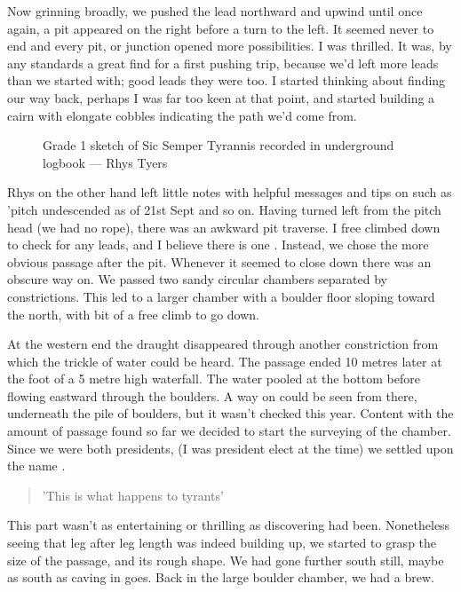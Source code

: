 Now grinning broadly, we pushed the lead northward and upwind until once again, a pit appeared on the right before a turn to the left. It seemed never to end and every pit, or junction opened more possibilities. I was thrilled. It was, by any standards a great find for a first pushing trip, because we'd left more leads than we started with; good leads they were too. I started thinking about finding our way back, perhaps I was far too keen at that point, and started building a cairn with elongate cobbles indicating the path we'd come from. 

\begin{figure}[t!]
\checkoddpage \ifoddpage \forcerectofloat \else \forceversofloat \fi
\centering
{}
\caption{Grade 1 sketch of Sic Semper Tyrannis recorded in underground logbook --- Rhys Tyers}
\label{G1 sketch}
\end{figure}

Rhys on the other hand left little notes with helpful messages and tips on such as 'pitch undescended as of 21st Sept and so on. Having turned left from the pitch head (we had no rope), there was an awkward pit traverse. I free climbed down to check for any leads, and I believe there is one \sidenote. Instead, we chose the more obvious passage after the pit. Whenever it seemed to close down there was an obscure way on. We passed two sandy circular chambers separated by constrictions. This led to a larger chamber with a boulder floor sloping toward the north, with bit of a free climb to go down. 

At the western end the draught disappeared through another constriction from which the trickle of water could be heard. The passage ended 10 metres later at the foot of a 5 metre high waterfall. The water pooled at the bottom before flowing eastward through the boulders. A way on could be seen from there, underneath the pile of boulders, but it wasn't checked this year. Content with the amount of passage found so far we decided to start the surveying of the chamber. Since we were both presidents, (I was president elect at the time) we settled upon the name . 
\begin{quote} 'This is what happens to tyrants' \end{quote}

This part wasn't as entertaining or thrilling as discovering had been. Nonetheless seeing that leg after leg length was indeed building up, we started to grasp the size of the passage, and its rough shape. We had gone further south still, maybe as south as caving in  goes. Back in the large boulder chamber, we had a brew.


